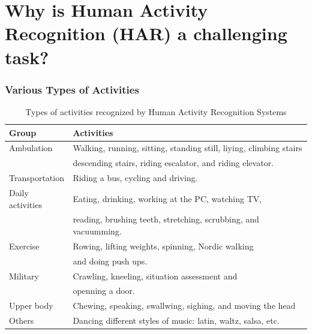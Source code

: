 \documentclass{beamer}
\theoremstyle{definition}
\begin{document}
\section{Why is Human Activity Recognition (HAR) a challenging task?} %




% 
% 


\begin{frame}
\frametitle{Various Types of Activities}

\begin{table}[h]
\label{t:typesofHAR}
\scriptsize{
\begin{tabular}{|l|l |}
\hline
\textbf{Group }& \textbf{Activities} \\ \hline
Ambulation & Walking, running, sitting, standing still, liying, climbing stairs \\ 
           & descending stairs, riding escalator, and riding elevator. \\ \hline
Transportation & Riding a bus, cycling and driving. \\ \hline
Daily activities & Eating, drinking, working at the PC, watching TV,\\ 
              & reading, brushing teeth, stretching, scrubbing, and vacuumming. \\ \hline
Exercise & Rowing, lifting weights, spinning, Nordic walking \\ 
       & and doing push ups. \\ \hline
Military & Crawling, kneeling, situation assessment and  \\ 
          & openning a door. \\ \hline
Upper body & Chewing, speaking, swallwing, sighing, and moving the head\\ \hline  
Others & Dancing different styles of music: latin, waltz, salsa, etc. \\ \hline  
\end{tabular}}
\caption{Types of activities recognized by Human Activity Recognition
Systems}
\end{table}

\end{frame}
\end{document}
